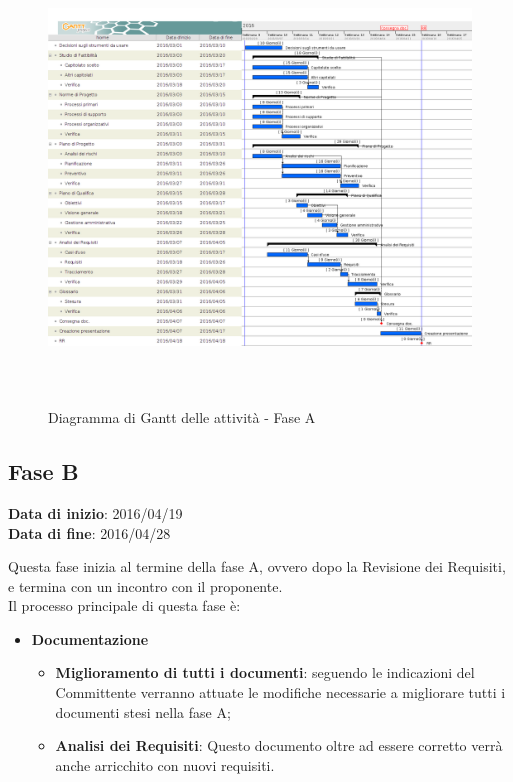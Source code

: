 		\begin{figure}[!h]
			\centering
			\includegraphics[height=12cm, width=15cm]{img/gantt/A} 
			\caption{Diagramma di Gantt delle attività - Fase A}
		\end{figure}
		
	\subsection{Fase B}
	\begin{center}
		\textbf{Data di inizio}: 2016/04/19 \\
		\textbf{Data di fine}: 2016/04/28 \\
	\end{center}
	Questa fase inizia al termine della fase A, ovvero dopo la Revisione dei Requisiti, e termina con un incontro con il proponente. \\ 
	Il processo principale di questa fase è:
	\begin{itemize}
		\item \textbf{Documentazione}
		\att
		\begin{itemize}
			\item \textbf{Miglioramento di tutti i documenti}: seguendo le indicazioni del Committente verranno attuate le modifiche necessarie a migliorare tutti i documenti stesi nella fase A;
			\item \textbf{Analisi dei Requisiti}: Questo documento oltre ad essere corretto verrà anche arricchito con nuovi requisiti.
		\end{itemize}
	\end{itemize}
		
